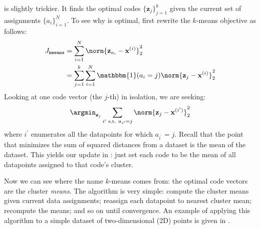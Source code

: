 \Eqn{\ref{eqn:representation_learning:kmeans_update_means}} is slightly trickier. It finds the optimal codes $\{\mathbf{z}_j\}_{j=1}^k$ given the current set of assignments $\{a_i\}_{i=1}^N$. To see why \eqn{\ref{eqn:representation_learning:kmeans_update_means}} is optimal, first rewrite the $k$-means objective as follows:
\begin{align}
    J_{\texttt{kmeans}} &= \sum_{i=1}^N \norm{\mathbf{z}_{a_i} - \mathbf{x}^{(i)}}^2_2\\
    &= \sum_{j=1}^k \sum_{i=1}^N \mathbbm{1}(a_i = j) \norm{\mathbf{z}_j - \mathbf{x}^{(i)}}^2_2
\end{align}
Looking at one code vector (the $j$-th) in isolation, we are seeking:
\begin{align}
    \argmin_{\mathbf{z}_j} \sum_{i^{\prime} \text{ s.t. } a_{i^\prime}=j} \norm{\mathbf{z}_j - \mathbf{x}^{(i^{\prime})}}^2_2
\end{align}
where $i^{\prime}$ enumerates all the datapoints for which $a_{i^\prime} = j$. Recall that the point that minimizes the sum of squared distances from a dataset is the mean of the dataset. This yields our update in \eqn{\ref{eqn:representation_learning:kmeans_update_means}}: just set each code to be the mean of all datapoints assigned to that code's cluster.

Now we can see where the name $k$-means comes from: the optimal code vectors are the cluster \textit{means}. The algorithm is very simple: compute the cluster means given current data assignments; reassign each datapoint to nearest cluster mean; recompute the means; and so on until convergence. An example of applying this algorithm to a simple dataset of two-dimensional (2D) points is given in \fig{\ref{fig:representation_learning:kmeans_ex}}.

